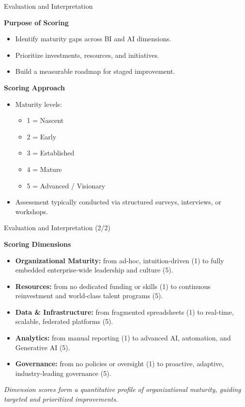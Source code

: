 \documentclass[aspectratio=169, table]{beamer}
\begin{document}
\begin{frame}{Evaluation and Interpretation }
	\vspace{20pt}
	
	\textbf{Purpose of Scoring}
	\begin{itemize}
		\item Identify maturity gaps across BI and AI dimensions.  
		\item Prioritize investments, resources, and initiatives.  
		\item Build a measurable roadmap for staged improvement.  
	\end{itemize}
	
	\textbf{Scoring Approach}
	\begin{itemize}
		\item Maturity levels:  
		\begin{itemize}
			\item 1 = Nascent  
			\item 2 = Early  
			\item 3 = Established  
			\item 4 = Mature  
			\item 5 = Advanced / Visionary  
		\end{itemize}
		\item Assessment typically conducted via structured surveys, interviews, or workshops.  
	\end{itemize}
\end{frame}

\begin{frame}{Evaluation and Interpretation (2/2)}
	\vspace{20pt}
	
	\textbf{Scoring Dimensions}
	\begin{itemize}
		\item \textbf{Organizational Maturity:} from ad-hoc, intuition-driven (1) to fully embedded enterprise-wide leadership and culture (5).  
		\item \textbf{Resources:} from no dedicated funding or skills (1) to continuous reinvestment and world-class talent programs (5).  
		\item \textbf{Data \& Infrastructure:} from fragmented spreadsheets (1) to real-time, scalable, federated platforms (5).  
		\item \textbf{Analytics:} from manual reporting (1) to advanced AI, automation, and Generative AI (5).  
		\item \textbf{Governance:} from no policies or oversight (1) to proactive, adaptive, industry-leading governance (5).  
	\end{itemize}
	
	\textit{Dimension scores form a quantitative profile of organizational maturity, guiding targeted and prioritized improvements.}
\end{frame}
\end{document}
